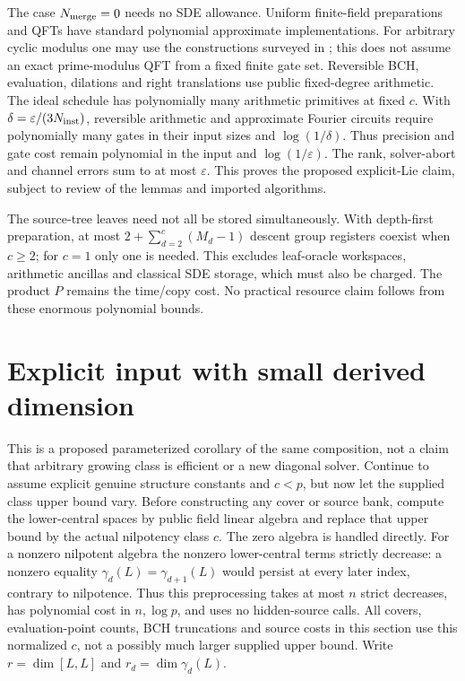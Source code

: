 \documentclass[11pt]{article}
\theoremstyle{remark}
\newcommand{\eps}{\varepsilon}
\begin{document}
The case $N_{\rm merge}=0$ needs no SDE allowance. Uniform finite-field
preparations and QFTs have standard polynomial approximate implementations.
For arbitrary cyclic modulus one may use the constructions surveyed in
\cite[Chapters 3 and 5]{hales}; this does not assume an exact prime-modulus
QFT from a fixed finite gate set.
Reversible BCH, evaluation, dilations and right translations use public
fixed-degree arithmetic. The ideal schedule has polynomially many arithmetic
primitives at fixed $c$. With $\delta=\eps/(3N_{\rm inst})$, reversible
arithmetic and approximate Fourier circuits require polynomially many gates
in their input sizes and $\log(1/\delta)$. Thus precision and gate cost
remain polynomial in the input and $\log(1/\eps)$.
The rank, solver-abort and channel errors sum to at most
$\eps$. This proves the proposed explicit-Lie claim, subject to review of
the lemmas and imported algorithms.

The source-tree leaves need not all be stored simultaneously. With
depth-first preparation, at most $2+\sum_{d=2}^c(M_d-1)$ descent group
registers coexist when $c\ge2$; for $c=1$ only one is needed. This excludes
leaf-oracle workspaces, arithmetic ancillas and classical SDE storage,
which must also be charged. The product $P$ remains the time/copy cost.
No practical resource claim follows from these enormous polynomial bounds.

\section{Explicit input with small derived dimension}\label{sec:rank}
This is a proposed parameterized corollary of the same composition, not a
claim that arbitrary growing class is efficient or a new diagonal solver.
Continue to assume explicit genuine structure constants and $c<p$, but
now let the supplied class upper bound vary. Before constructing any cover
or source bank, compute the lower-central spaces by public field linear
algebra and replace that upper bound by the actual nilpotency class $c$.
The zero algebra is handled directly. For a nonzero nilpotent algebra the
nonzero lower-central terms strictly decrease: a nonzero equality
$\gamma_d(L)=\gamma_{d+1}(L)$ would persist at every later index, contrary
to nilpotence. Thus this preprocessing takes at most $n$ strict decreases,
has polynomial cost in $n,\log p$, and uses no hidden-source calls.
All covers, evaluation-point counts, BCH truncations and source costs in
this section use this normalized $c$, not a possibly much larger supplied
upper bound. Write $r=\dim[L,L]$ and $r_d=\dim\gamma_d(L)$.
\end{document}
